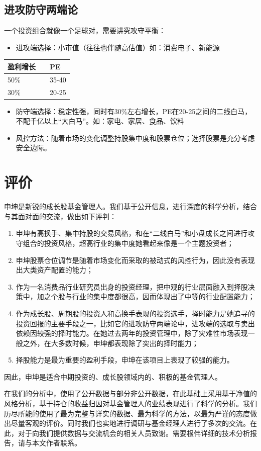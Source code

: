 \documentclass[journal=jacsat,manuscript=article]{achemso}
\providecommand{\tightlist}{%
  \setlength{\itemsep}{0pt}\setlength{\parskip}{0pt}}
\begin{document}
\subsection{进攻防守两端论}

一个投资组合就像一个足球对，需要讲究攻守平衡：

\begin{itemize}
\tightlist
\item
  进攻端选择：小市值（往往也伴随高估值）如：消费电子、新能源
\end{itemize}

\begin{longtable}[]{@{}ll@{}}
\toprule
盈利增长　 & PE\tabularnewline
\midrule
\endhead
50\% & 35-40\tabularnewline
30\% & 20-25\tabularnewline
\bottomrule
\end{longtable}

\begin{itemize}
\item
  防守端选择：稳定性强，同时有30\%左右增长，PE在20-25之间的二线白马，不配千亿以上``大白马''。如：家电、家居、食品、饮料
\item
  风控方法：随着市场的变化调整持股集中度和股票仓位；选择股票是充分考虑安全边际。
\end{itemize}

\section{评价}

申坤是新锐的成长股基金管理人。我们基于公开信息，进行深度的科学分析，结合与其面对面的交流，做出如下评判：

\begin{enumerate}
\def\labelenumi{\arabic{enumi}.}
\tightlist
\item
  申坤有高换手、集中持股的交易风格，和在``二线白马''和小盘成长之间进行攻守组合的投资风格，超高行业的集中度她看起来像是一个主题投资者；
\item
  申坤股票仓位调节是随着市场变化而采取的被动式的风控行为，因此没有表现出大类资产配置的能力；
\item
  作为一名消费品行业研究员出身的投资经理，把中观的行业层面融入到择股决策中，加之个股与行业的集中度都很高，因而体现出了中等的行业配置能力；
\item
  作为成长股、周期股的投资人和高换手表现的投资选手，择时能力是她追寻的投资回报的主要手段之一，比如它的进攻防守两端论中，进攻端的选取与卖出依赖因较强的择时能力。在她过去两年的投资管理中，除了灾难性市场表现一般之外，在大多数时候，申坤都表现除了突出的择时能力；
\item
  择股能力是最为重要的盈利手段，申坤在该项目上表现了较强的能力。
\end{enumerate}

因此，申坤是适合中期投资的、成长股领域内的、积极的基金管理人。

\begin{acknowledgement}

在我们的分析中，使用了公开数据与部分非公开数据，在此基础上采用基于净值的风格分析，基于持仓的收益归因对基金管理人的业绩表现进行了科学的分析。我们历尽所能的使用了最为完整与详实的数据、最为科学的方法，以最为严谨的态度做出尽量客观的评价。同时我们也实地进行调研与基金经理人进行了多次的交流。在此，对于向我们提供数据与交流机会的相关人员致谢。需要根伟详细的技术分析报告，请与本文作者联系。

\end{acknowledgement}
\end{document}
